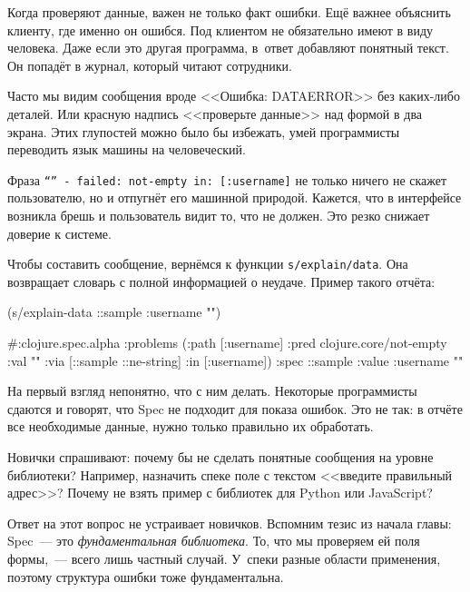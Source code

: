 
\label{spec-messages}

Когда проверяют данные, важен не только факт ошибки. Ещё важнее объяснить
клиенту, где именно он ошибся. Под клиентом не обязательно имеют в виду
человека. Даже если это другая программа, в~ответ добавляют понятный текст. Он
попадёт в журнал, который читают сотрудники.

Часто мы видим сообщения вроде <<Ошибка: DATAERROR>> без каких-либо деталей. Или
красную надпись <<проверьте данные>> над формой в два экрана. Этих глупостей
можно было бы избежать, умей программисты переводить язык машины на человеческий.


Фраза \texttt{``'' - failed: not-empty in: [:user\-name]} не только ничего не скажет
пользователю, но и отпугнёт его машинной природой. Кажется, что в интерфейсе
возникла брешь и пользователь видит то, что не должен. Это резко снижает
доверие к системе.

Чтобы составить сообщение, вернёмся к функции \texttt{s/explain\-/data}. Она
возвращает словарь с полной информацией о неудаче. Пример такого отчёта:


\begin{clojure}
(s/explain-data ::sample {:username ""})

#:clojure.spec.alpha
{:problems
 ({:path [:username]
   :pred clojure.core/not-empty
   :val ""
   :via [::sample ::ne-string]
   :in [:username]})
 :spec ::sample
 :value {:username ""}}
\end{clojure}



На первый взгляд непонятно, что с ним делать. Некоторые программисты сдаются и
говорят, что Spec не подходит для показа ошибок. Это не так: в отчёте все
необходимые данные, нужно только правильно их обработать.

Новички спрашивают: почему бы не сделать понятные сообщения на уровне
библиотеки? Например, назначить спеке поле с текстом <<введите правильный
адрес>>? Почему не взять пример с библиотек для Python или JavaScript?


Ответ на этот вопрос не устраивает новичков. Вспомним тезис из начала главы:
Spec~--- это \emph{фундаментальная библиотека}. То, что мы проверяем ей поля
формы,~--- всего лишь частный случай. У~спеки разные области применения, поэтому
структура ошибки тоже фундаментальна.

